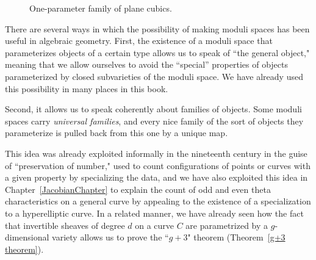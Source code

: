 \begin{figure}
\vskip-10pt
\inprogress
{}
\vskip-10pt
 \caption{One-parameter family of plane cubics.}
\end{figure}
 
There are several ways in which the possibility of making moduli spaces has been useful in algebraic geometry. First, the existence of a moduli space that  parameterizes objects of a certain type allows us to speak of ``the general object," meaning that we allow ourselves to avoid the ``special'' properties of objects parameterized by closed subvarieties of the moduli space. We have already used this
possibility in many places in this book. 

Second, it allows us to speak coherently about
families of objects. Some moduli spaces carry \emph{universal families}, and every nice family of the sort of objects
they parameterize is pulled back from this one by a unique map.  

This idea was already exploited informally in the nineteenth century in the guise of ``preservation of number," used to count configurations of points or curves with a given property by specializing the 
data, and we have also exploited this idea in
Chapter~\ref{JacobianChapter} to explain the count of odd and even theta characteristics on a general curve by appealing to the existence of a specialization to a hyperelliptic curve. In a related manner, we have already seen how the fact that invertible sheaves of degree $d$ on a curve $C$ are parametrized by a $g$-dimensional variety allows us to prove the ``$g+3$" theorem (Theorem~\ref{g+3 theorem}).

